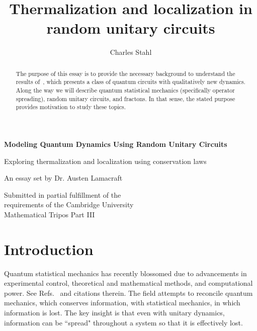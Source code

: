 \documentclass[a4paper,11pt]{article}
\title{Thermalization and localization in random unitary circuits}
\author{Charles Stahl}
\begin{document}
	
\begin{titlepage}
	\begin{center}
		\vspace*{1cm}
		
		\Huge
		\textbf{Modeling Quantum Dynamics Using Random Unitary Circuits}
		
		\vspace{0.5cm}
		\LARGE
		Exploring thermalization and localization using conservation laws
		
		\vspace{5.5cm}
		
		
		
		\vspace{3.5cm}
		
		An essay set by Dr. Austen Lamacraft
		
		\vspace{0.8cm}
		
		
		\Large
		Submitted in partial fulfillment of the \\
		requirements of the Cambridge University\\
		Mathematical Tripos Part III
		
	\end{center}
\end{titlepage}

\begin{abstract}

The purpose of this essay is to provide the necessary background to understand the results of~\cite{PaiFracton}, which presents a class of quantum circuits with qualitatively new dynamics. Along the way we will describe quantum statistical mechanics (specifically operator spreading), random unitary circuits, and fractons. In that sense, the stated purpose provides motivation to study these topics.

\end{abstract}

\section{Introduction} \label{sec:intro}

Quantum statistical mechanics has recently blossomed due to advancements in experimental control, theoretical and mathematical methods, and computational power. See Refs.~\cite{Cazalilla2010, PolkovnikovClosed, Nandkishore14, GogolinStatMech} and citations therein. The field attempts to reconcile quantum mechanics, which conserves information, with statistical mechanics, in which information is lost. The key insight is that even with unitary dynamics, information can be ``spread" throughout a system so that it is effectively lost.
\end{document}

